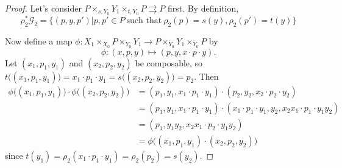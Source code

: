 \documentclass[12pt]{amsart}
\theoremstyle{definition}
\theoremstyle{remark}
\numberwithin{equation}{section}
\newcommand{\CG}{{\mathcal G}}
\begin{document}
\begin{proof} Let's consider $ P \times_{s,Y_0} Y_1\times_{t,Y_0} P \rightrightarrows P$ first. By definition, 
	\begin{equation}
	\rho_2^*\CG_2=\{(p,y,p')| p,p' \in P \ \text{such that}\   \rho_2(p)=s(y), \rho_2(p')=t(y) \}
	\end{equation}
	 
 Now define a map $\phi: X_1\times_{X_0} P\times_{Y_0} Y_1 \to  P \times_{Y_0} Y_1\times_{Y_0}P$ by 
	\begin{equation}
	\phi: (x,p,y)\mapsto (  p, y, x\cdot p\cdot y).
	\end{equation}
	Let $(x_1,p_1,y_1)$ and $(x_2,p_2,y_2)$ be composable, so $t\big( (x_1,p_1,y_1)\big)=x_1\cdot p_1\cdot y_1= s\big((x_2,p_2,y_2) \big)=p_2$. Then 
	\begin{align*}
\phi\big( (x_1,p_1,y_1)\big)\cdot \phi\big( (x_2,p_2,y_2)\big)&=( p_1, y_1,x_1\cdot p_1\cdot y_1 )\cdot ( p_2, y_2,x_2\cdot p_2\cdot y_2 )\\
&=( p_1, y_1,x_1\cdot p_1\cdot y_1 )\cdot ( x_1\cdot p_1\cdot y_1, y_2,x_2x_1\cdot p_1\cdot y_1 y_2 )\\
&=(p_1,y_1y_2, x_2x_1\cdot p_2\cdot y_1 y_2)\\
&=\phi\big( (x_1,p_1,y_1)\cdot(x_2,p_2,y_2)\big)
	\end{align*}
	since $t(y_1)=\rho_2(x_1\cdot p_1\cdot y_1)=\rho_2(p_2)=s(y_2).$




\end{proof}
\end{document}
